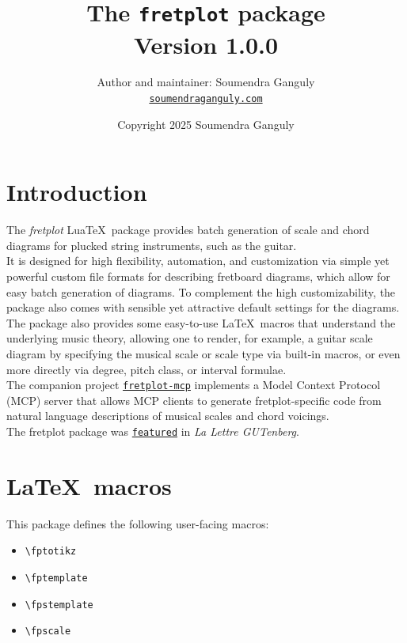 \documentclass[12pt,letterpaper]{article}
\title{The \texttt{fretplot} package\\\large Version 1.0.0}
\author{Author and maintainer: Soumendra Ganguly\\\href{https://soumendraganguly.com}{\texttt{soumendraganguly.com}}}
\date{Copyright 2025 Soumendra Ganguly}
\begin{document}
\maketitle
\thispagestyle{empty}
\tableofcontents

\newpage

\section{Introduction}

The \textit{fretplot} Lua\TeX\ package provides batch generation of scale and chord diagrams for plucked string instruments, such as the guitar.\\

It is designed for high flexibility, automation, and customization via simple yet powerful custom file formats for describing fretboard diagrams, which allow for easy batch generation of diagrams. To complement the high customizability, the package also comes with sensible yet attractive default settings for the diagrams.\\

The package also provides some easy-to-use \LaTeX\ macros that understand the underlying music theory, allowing one to render, for example, a guitar scale diagram by specifying the musical scale or scale type via built-in macros, or even more directly via degree, pitch class, or interval formulae.\\

The companion project \href{https://github.com/8vasu/fretplot-mcp}{\texttt{fretplot-mcp}} implements a Model Context Protocol (MCP) server that allows MCP clients to generate fretplot-specific code from natural language descriptions of musical scales and chord voicings.\\

The fretplot package was \href{https://publications.gutenberg-asso.fr/lettre/article/view/131}{\texttt{featured}} in \textit{La Lettre GUTenberg}.

\newpage

\section{\LaTeX\ macros}

This package defines the following user-facing macros:

\begin{itemize}
  \item \verb|\fptotikz|
  \item \verb|\fptemplate|
  \item \verb|\fpstemplate|
  \item \verb|\fpscale|
\end{itemize}
\end{document}
